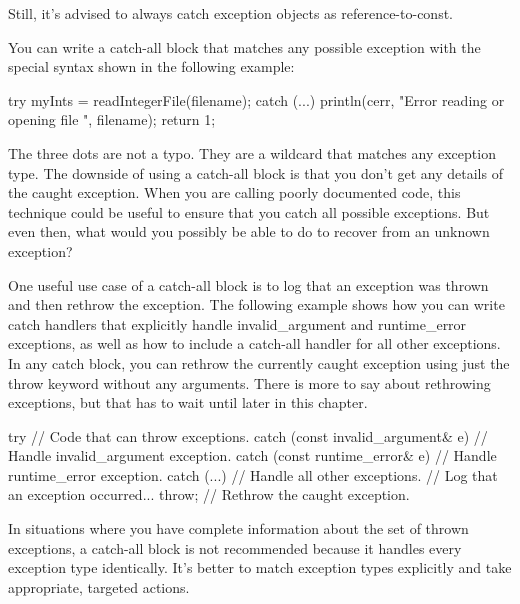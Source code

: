 \begin{cpp}
} catch (runtime_error& e) {
\end{cpp}

Still, it’s advised to always catch exception objects as reference-to-const.


You can write a catch-all block that matches any possible exception with the special syntax shown in the following example:

\begin{cpp}
try {
    myInts = readIntegerFile(filename);
} catch (...) {
    println(cerr, "Error reading or opening file {}", filename);
    return 1;
}
\end{cpp}

The three dots are not a typo. They are a wildcard that matches any exception type. The downside of using a catch-all block is that you don’t get any details of the caught exception. When you are calling poorly documented code, this technique could be useful to ensure that you catch all possible exceptions. But even then, what would you possibly be able to do to recover from an unknown exception?

One useful use case of a catch-all block is to log that an exception was thrown and then rethrow the exception. The following example shows how you can write catch handlers that explicitly handle invalid\_argument and runtime\_error exceptions, as well as how to include a catch-all handler for all other exceptions. In any catch block, you can rethrow the currently caught exception using just the throw keyword without any arguments. There is more to say about rethrowing exceptions, but that has to wait until later in this chapter.

\begin{cpp}
try {
    // Code that can throw exceptions.
} catch (const invalid_argument& e) {
    // Handle invalid_argument exception.
} catch (const runtime_error& e) {
    // Handle runtime_error exception.
} catch (...) {
    // Handle all other exceptions.
    // Log that an exception occurred...
    throw; // Rethrow the caught exception.
}
\end{cpp}

In situations where you have complete information about the set of thrown exceptions, a catch-all block is not recommended because it handles every exception type identically. It’s better to match exception types explicitly and take appropriate, targeted actions.

